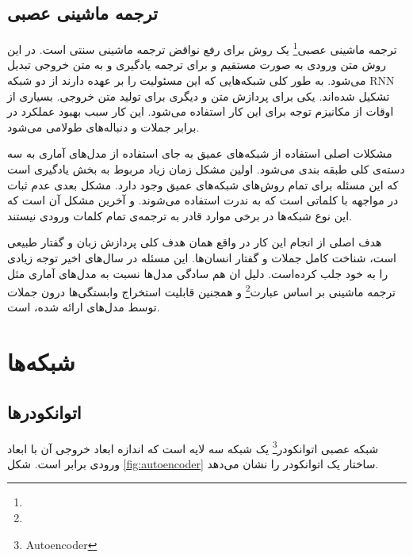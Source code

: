 \documentclass[12pt, a4paper, oneside]{report}
\begin{document}
\subsection{ترجمه ماشینی عصبی}
ترجمه ماشینی عصبی\footnote{}
یک روش برای رفع نواقض ترجمه ماشینی سنتی است. در این روش متن ورودی به صورت مستقیم و
برای ترجمه یادگیری و به متن خروجی تبدیل می‌شود.
به طور کلی شبکه‌هایی که این مسئولیت را بر عهده دارند از دو شبکه
RNN
تشکیل شده‌اند. یکی برای پردازش متن و دیگری برای تولید متن خروجی.
بسیاری از اوقات از مکانیزم توجه برای این کار استفاده می‌شود.
این کار سبب بهبود عملکرد در برابر جملات و دنباله‌های طولامی می‌شود.

مشکلات اصلی استفاده از شبکه‌های عمیق به جای استفاده از مدل‌های آماری به سه دسته‌ی کلی طبقه بندی می‌شود.
اولین مشکل زمان زیاد مربوط به بخش یادگیری است که این مسئله برای تمام روش‌های شبکه‌های عمیق وجود دارد.
مشکل بعدی عدم ثبات در مواجهه با کلماتی است که به ندرت استفاده می‌شوند.
و آخرین مشکل آن است که این نوع شبکه‌ها در برخی موارد قادر به ترجمه‌ی تمام کلمات ورودی نیستند.\cite{wu2016google}

هدف اصلی از انجام این کار در واقع همان هدف کلی پردازش زبان و گفتار طبیعی است، شناخت کامل جملات
و گفتار انسان‌ها. این مسئله در سال‌های اخیر توجه زیادی را به خود جلب کرده‌است. دلیل ان هم سادگی
مدل‌ها نسبت به مدل‌های آماری مثل ترجمه ماشینی بر اساس عبارت\footnote{}
و همجنین قابلیت استخراج وابستگی‌ها درون جملات توسط مدل‌های ارائه شده، است.
\cite{yang2020survey}

\section{شبکه‌ها}

\subsection{اتوانکودرها}

شبکه عصبی
اتوانکودر\footnote{Autoencoder}
یک شبکه سه لایه است که اندازه ابعاد خروجی آن با ابعاد ورودی برابر است. شکل 
\ref{fig:autoencoder}
ساختار یک اتوانکودر را نشان می‌دهد.
\end{document}
